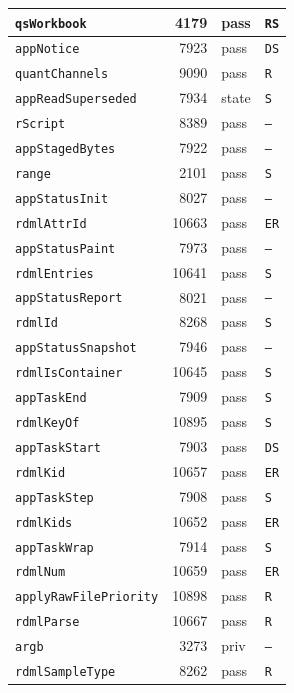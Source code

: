 {\begin{xltabular}{\linewidth}{|l|r|X|X|}
\texttt{qsWorkbook} & 4179 & pass & \texttt{RS} \\ \hline
\texttt{appNotice} & 7923 & pass & \texttt{DS} \\ \hline
\texttt{quantChannels} & 9090 & pass & \texttt{R} \\ \hline
\texttt{appReadSuperseded} & 7934 & state & \texttt{S} \\ \hline
\texttt{rScript} & 8389 & pass & \texttt{--} \\ \hline
\texttt{appStagedBytes} & 7922 & pass & \texttt{--} \\ \hline
\texttt{range} & 2101 & pass & \texttt{S} \\ \hline
\texttt{appStatusInit} & 8027 & pass & \texttt{--} \\ \hline
\texttt{rdmlAttrId} & 10663 & pass & \texttt{ER} \\ \hline
\texttt{appStatusPaint} & 7973 & pass & \texttt{--} \\ \hline
\texttt{rdmlEntries} & 10641 & pass & \texttt{S} \\ \hline
\texttt{appStatusReport} & 8021 & pass & \texttt{--} \\ \hline
\texttt{rdmlId} & 8268 & pass & \texttt{S} \\ \hline
\texttt{appStatusSnapshot} & 7946 & pass & \texttt{--} \\ \hline
\texttt{rdmlIsContainer} & 10645 & pass & \texttt{S} \\ \hline
\texttt{appTaskEnd} & 7909 & pass & \texttt{S} \\ \hline
\texttt{rdmlKeyOf} & 10895 & pass & \texttt{S} \\ \hline
\texttt{appTaskStart} & 7903 & pass & \texttt{DS} \\ \hline
\texttt{rdmlKid} & 10657 & pass & \texttt{ER} \\ \hline
\texttt{appTaskStep} & 7908 & pass & \texttt{S} \\ \hline
\texttt{rdmlKids} & 10652 & pass & \texttt{ER} \\ \hline
\texttt{appTaskWrap} & 7914 & pass & \texttt{S} \\ \hline
\texttt{rdmlNum} & 10659 & pass & \texttt{ER} \\ \hline
\texttt{applyRawFilePriority} & 10898 & pass & \texttt{R} \\ \hline
\texttt{rdmlParse} & 10667 & pass & \texttt{R} \\ \hline
\texttt{argb} & 3273 & priv & \texttt{--} \\ \hline
\texttt{rdmlSampleType} & 8262 & pass & \texttt{R} \\ \hline

\end{xltabular}}
